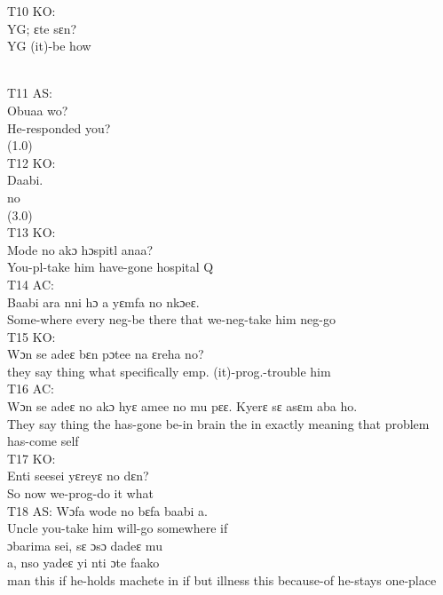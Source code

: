\documentclass[output=paper,colorlinks,citecolor=brown]{langscibook}
\begin{document}

\ea
    T10 KO:\\
    \gll    YG; ɛte sɛn? \\
            YG (it)-be how \\
\z

\\

\ea
    T11 AS:\\
    \gll    Obuaa wo?\\
            He-responded you?\\
            (1.0)\\
\ex
    T12 KO:\\
    \gll    Daabi. \\
            no \\
            (3.0)\\
\ex
    T13 KO:\\
    \gll    Mode no akɔ hɔspitl anaa? \\
            You-pl-take him have-gone hospital Q \\
\ex
    T14 AC:\\
    \gll    Baabi ara nni hɔ a yɛmfa no nkɔeɛ. \\
            Some-where every neg-be there that we-neg-take him neg-go \\
\ex
    T15 KO:\\
    \gll    Wɔn se adeɛ bɛn pɔtee na ɛreha no? \\
            they say thing what specifically emp. (it)-prog.-trouble him \\
\ex
    T16 AC:\\
    \gll    Wɔn se adeɛ no akɔ hyɛ amee no mu pɛɛ. Kyerɛ sɛ asɛm aba ho. \\
            They say thing the has-gone be-in brain the in exactly meaning that problem has-come self \\
\ex
    T17 KO:\\
    \gll    Enti seesei yɛreyɛ no dɛn? \\
            So now we-prog-do it what \\
\ex
    T18 AS:
    \ea 
    \gll    Wɔfa wode no bɛfa baabi a. \\
            Uncle you-take him will-go somewhere if \\
    \ex
    \gll    ɔbarima sei, sɛ ɔsɔ dadeɛ mu \\ a, nso yadeɛ yi nti ɔte faako\\
            man this if he-holds machete in if but illness this because-of he-stays one-place \\
\end{document}
